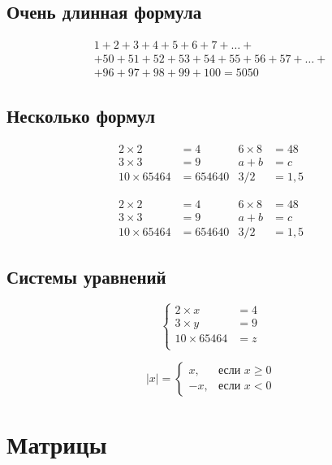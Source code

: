 \documentclass[a4paper,12pt]{article}
\begin{document}
\subsection{Очень длинная формула}

\begin{multline}
	1+ 2+3+4+5+6+7+\dots + \\ 
	+ 50+51+52+53+54+55+56+57 + \dots + \\ 
	+ 96+97+98+99+100=5050 \tag{S} \label{eq:sum}
\end{multline}


\subsection{Несколько формул}

\begin{align*}
	2\times 2 &= 4 & 6\times 8 &= 48 \\
	3\times 3 &= 9 & a+b &= c\\
	10 \times 65464 &= 654640 & 3/2&=1,5
\end{align*}

\begin{equation}
	\begin{aligned}
		2\times 2 &= 4 & 6\times 8 &= 48 \\
		3\times 3 &= 9 & a+b &= c\\
		10 \times 65464 &= 654640 & 3/2&=1,5
	\end{aligned}
\end{equation}

\subsection{Системы уравнений}

\[
	\left\{
		\begin{aligned}
			2\times x &= 4  \\
			3\times y &= 9\\
			10 \times 65464 &= z\\
		\end{aligned}
	\right.
\]

\[
	|x|=\begin{cases}
		x, &\text{если }  x \ge 0 \\
		-x, &\text{если } x<0
	\end{cases}
\]

\section{Матрицы}
\end{document}
